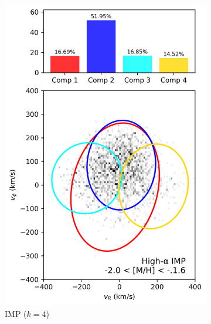 \documentclass[a4paper,12pt]{article}
\begin{document}
\begin{figure}[H]
\begin{subfigure}{0.245\linewidth}
    \includegraphics[width=\linewidth]{../figures/gmm_imp_high_alpha_k4.png}
    \caption{IMP ($k{=}4$)}
    \label{fig:imp_hi}
  \end{subfigure}\hfill
  \begin{subfigure}{0.245\linewidth}

\end{subfigure}
\end{figure}
\end{document}
